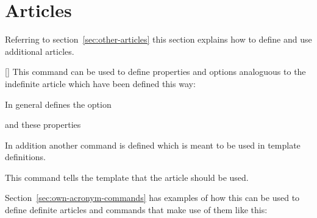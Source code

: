 \documentclass{acro-manual}
\begin{document}
\section{Articles}\label{sec:articles}
Referring to section~\vref{sec:other-articles} this section explains how to
define and use additional articles.
\begin{commands}
  []
    This command can be used to define properties and options analoguous to
    the indefinite article which have been defined this way:
\end{commands}
\begin{sourcecode}
\end{sourcecode}
In general  defines the
option
\begin{options}
\end{options}
and these properties
\begin{properties}
\end{properties}
In addition another command is defined which is meant to be used in
template definitions.
\begin{commands}
    This command tells the template that the article  should be
    used.
\end{commands}
Section~\vref{sec:own-acronym-commands} has examples of how this can be used
to define definite articles and commands that make use of them like this:
\begin{example}
   \par
\end{example}
\end{document}
